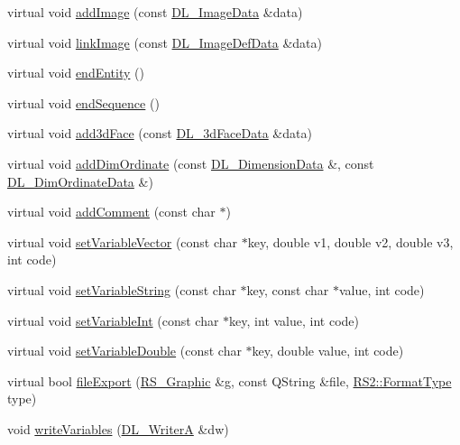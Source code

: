 \begin{DoxyCompactItemize}
\item 
virtual void \hyperlink{classRS__FilterJWW_a13fd876f765a349dc603e56be409bc53}{add\-Image} (const \hyperlink{structDL__ImageData}{D\-L\-\_\-\-Image\-Data} \&data)
\item 
virtual void \hyperlink{classRS__FilterJWW_a758330b3a415edcbc203a0cb48c8f977}{link\-Image} (const \hyperlink{structDL__ImageDefData}{D\-L\-\_\-\-Image\-Def\-Data} \&data)
\item 
virtual void \hyperlink{classRS__FilterJWW_af9786a679b460d17e0dce54fe20dd9d7}{end\-Entity} ()
\item 
virtual void \hyperlink{classRS__FilterJWW_af06b9399eb4a3ead80bd49c03dcd206e}{end\-Sequence} ()
\item 
virtual void \hyperlink{classRS__FilterJWW_a1268d5cef5738dcc44889e406bfd3636}{add3d\-Face} (const \hyperlink{structDL__TraceData}{D\-L\-\_\-3d\-Face\-Data} \&data)
\item 
virtual void \hyperlink{classRS__FilterJWW_a649e35a486b47bb7bc4eb601c8963b17}{add\-Dim\-Ordinate} (const \hyperlink{structDL__DimensionData}{D\-L\-\_\-\-Dimension\-Data} \&, const \hyperlink{structDL__DimOrdinateData}{D\-L\-\_\-\-Dim\-Ordinate\-Data} \&)
\item 
virtual void \hyperlink{classRS__FilterJWW_a8dc10ae53aa5623b3364f0c039c1926a}{add\-Comment} (const char $\ast$)
\item 
virtual void \hyperlink{classRS__FilterJWW_aeacb6893b7aeb7b9e9e9f353b7945c3e}{set\-Variable\-Vector} (const char $\ast$key, double v1, double v2, double v3, int code)
\item 
virtual void \hyperlink{classRS__FilterJWW_a1df5aae4e851fc0d2f4bbe45d3a1339b}{set\-Variable\-String} (const char $\ast$key, const char $\ast$value, int code)
\item 
virtual void \hyperlink{classRS__FilterJWW_ac37cd4f283100fcb2cf138028dd0592e}{set\-Variable\-Int} (const char $\ast$key, int value, int code)
\item 
virtual void \hyperlink{classRS__FilterJWW_a8f3ff4d0badc464c7516cc410cfcb4fe}{set\-Variable\-Double} (const char $\ast$key, double value, int code)
\item 
virtual bool \hyperlink{classRS__FilterJWW_a7c1cec5dda9cb54bb0f41d6f071c95df}{file\-Export} (\hyperlink{classRS__Graphic}{R\-S\-\_\-\-Graphic} \&g, const Q\-String \&file, \hyperlink{classRS2_a077a6c94c9a0ab9962c4d4a612c7189b}{R\-S2\-::\-Format\-Type} type)
\item 
void \hyperlink{classRS__FilterJWW_afd0fa38e320d716f2418d4f8604ecbe5}{write\-Variables} (\hyperlink{classDL__WriterA}{D\-L\-\_\-\-Writer\-A} \&dw)

\end{DoxyCompactItemize}
